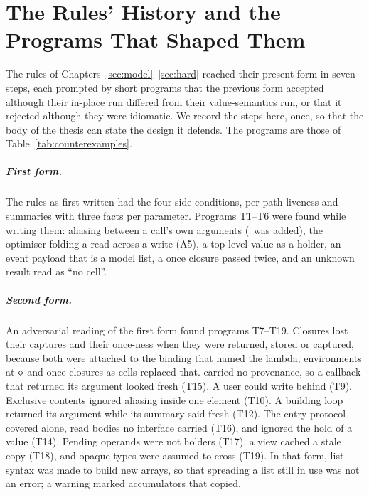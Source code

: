 \chapter{The Rules' History and the Programs That Shaped Them}
\label{app:history}

The rules of Chapters~\ref{sec:model}--\ref{sec:hard} reached their present form in seven steps, each
prompted by short programs that the previous form accepted although their in-place run differed from
their value-semantics run, or that it rejected although they were idiomatic. We record the steps here,
once, so that the body of the thesis can state the design it defends. The programs are those of
Table~\ref{tab:counterexamples}.

\paragraph{First form.} The rules as first written had the four side conditions, per-path liveness and
summaries with three facts per parameter. Programs T1--T6 were found while writing them: aliasing between
a call's own arguments (\Disjoint\ was added), the optimiser folding a read across a write (A5), a
top-level value as a holder, an event payload that is a model list, a once closure passed twice, and an
unknown result read as ``no cell''.

\paragraph{Second form.} An adversarial reading of the first form found programs T7--T19. Closures lost
their captures and their once-ness when they were returned, stored or captured, because both were
attached to the binding that named the lambda; environments at $\diamond$ and once closures as cells replaced
that.  carried no provenance, so a callback that returned its argument looked fresh (T15).
A user  could write behind \code{==} (T9). Exclusive contents ignored aliasing inside one element
(T10). A building loop returned its argument while its summary said fresh (T12). The entry protocol
covered  alone, read bodies no interface carried (T16), and ignored the hold of a value
 (T14). Pending operands were not holders (T17), a view cached a stale copy (T18), and opaque
types were assumed to cross (T19). In that form, list syntax was made to build new arrays, so that
spreading a list still in use was not an error; a warning marked accumulators that copied.

